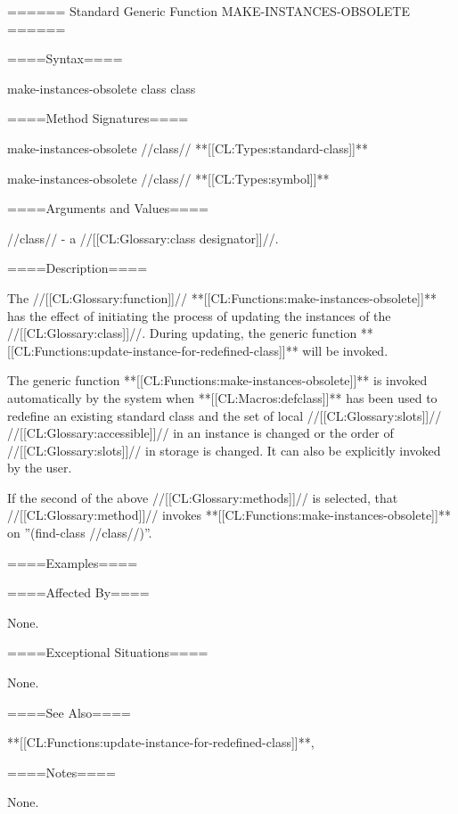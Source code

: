 ====== Standard Generic Function MAKE-INSTANCES-OBSOLETE ======

====Syntax====

\DefgenWithValues make-instances-obsolete {class} {class}

====Method Signatures====

\Defmeth make-instances-obsolete {//class// **[[CL:Types:standard-class]]**}

\Defmeth make-instances-obsolete {//class// **[[CL:Types:symbol]]**}

====Arguments and Values====

//class// - a //[[CL:Glossary:class designator]]//.

====Description====

The //[[CL:Glossary:function]]// **[[CL:Functions:make-instances-obsolete]]** has the effect of initiating the process of updating the instances of the //[[CL:Glossary:class]]//. During updating, the generic function **[[CL:Functions:update-instance-for-redefined-class]]** will be invoked.

The generic function **[[CL:Functions:make-instances-obsolete]]** is invoked automatically by the system when **[[CL:Macros:defclass]]** has been used to redefine an existing standard class and the set of local //[[CL:Glossary:slots]]// //[[CL:Glossary:accessible]]// in an instance is changed or the order of //[[CL:Glossary:slots]]// in storage is changed. It can also be explicitly invoked by the user.

If the second of the above //[[CL:Glossary:methods]]// is selected, that //[[CL:Glossary:method]]// invokes **[[CL:Functions:make-instances-obsolete]]** on ''(find-class //class//)''.

====Examples====


====Affected By====

None.

====Exceptional Situations====

None.

====See Also====

**[[CL:Functions:update-instance-for-redefined-class]]**, {\secref\ClassReDef}

====Notes====

None.


